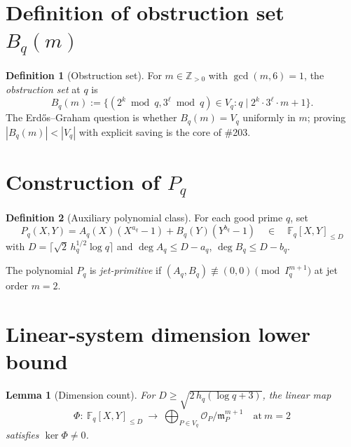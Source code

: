 \documentclass[12pt]{amsart}
\newtheorem{lemma}{Lemma}
\theoremstyle{definition}
\newtheorem{definition}{Definition}
\theoremstyle{remark}
\begin{document}
\section{Definition of obstruction set $B_q(m)$}

\begin{definition}[Obstruction set]
For $m \in \mathbb{Z}_{>0}$ with $\gcd(m, 6) = 1$, the
\emph{obstruction set} at $q$ is
$$
B_q(m) := \{(2^k \bmod q, 3^\ell \bmod q) \in V_q :
q \mid 2^k \cdot 3^\ell \cdot m + 1\}.
$$
The Erd\H{o}s--Graham question is whether $B_q(m) = V_q$ uniformly in $m$;
proving $|B_q(m)| < |V_q|$ with explicit saving is the core of \#203.
\end{definition}

\section{Construction of $P_q$}

\begin{definition}[Auxiliary polynomial class]
For each good prime $q$, set
$$
P_q(X, Y) = A_q(X) (X^{a_q} - 1) + B_q(Y) (Y^{b_q} - 1)
\quad\in\quad \mathbb{F}_q[X, Y]_{\le D}
$$
with $D = \lceil \sqrt{2}\, h_q^{1/2} \log q \rceil$ and
$\deg A_q \le D - a_q$, $\deg B_q \le D - b_q$.

The polynomial $P_q$ is \emph{jet-primitive} if
$(A_q, B_q) \not\equiv (0, 0) \pmod{I_q^{m+1}}$ at jet order $m = 2$.
\end{definition}

\section{Linear-system dimension lower bound}

\begin{lemma}[Dimension count]\label{lem:dim}
For $D \ge \sqrt{2\, h_q (\log q + 3)}$, the linear map
$$
\Phi:\ \mathbb{F}_q[X, Y]_{\le D}\ \longrightarrow\
\bigoplus_{P \in V_q} \mathcal{O}_P / \mathfrak{m}_P^{m+1}
\quad\text{at}\ m = 2
$$
satisfies $\ker \Phi \neq 0$.
\end{lemma}
\end{document}
